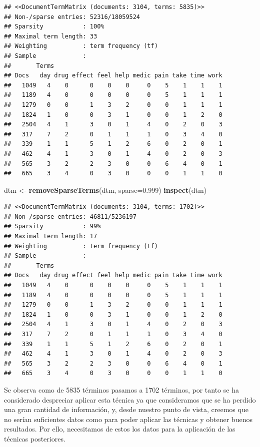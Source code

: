 \documentclass[spanish,]{article}
\newenvironment{Shaded}{\begin{snugshade}}{\end{snugshade}}
\newcommand{\KeywordTok}[1]{\textcolor[rgb]{0.13,0.29,0.53}{\textbf{#1}}}
\newcommand{\DataTypeTok}[1]{\textcolor[rgb]{0.13,0.29,0.53}{#1}}
\newcommand{\FloatTok}[1]{\textcolor[rgb]{0.00,0.00,0.81}{#1}}
\newcommand{\StringTok}[1]{\textcolor[rgb]{0.31,0.60,0.02}{#1}}
\newcommand{\NormalTok}[1]{#1}
\begin{document}
\begin{verbatim}
## <<DocumentTermMatrix (documents: 3104, terms: 5835)>>
## Non-/sparse entries: 52316/18059524
## Sparsity           : 100%
## Maximal term length: 33
## Weighting          : term frequency (tf)
## Sample             :
##       Terms
## Docs   day drug effect feel help medic pain take time work
##   1049   4    0      0    0    0     0    5    1    1    1
##   1189   4    0      0    0    0     0    5    1    1    1
##   1279   0    0      1    3    2     0    0    1    1    1
##   1824   1    0      0    3    1     0    0    1    2    0
##   2504   4    1      3    0    1     4    0    2    0    3
##   317    7    2      0    1    1     1    0    3    4    0
##   339    1    1      5    1    2     6    0    2    0    1
##   462    4    1      3    0    1     4    0    2    0    3
##   565    3    2      2    3    0     0    6    4    0    1
##   665    3    4      0    3    0     0    0    1    1    0
\end{verbatim}

\begin{Shaded}
\begin{Highlighting}[]
\NormalTok{dtm <-}\StringTok{ }\KeywordTok{removeSparseTerms}\NormalTok{(dtm, }\DataTypeTok{sparse=}\FloatTok{0.999}\NormalTok{)}
\KeywordTok{inspect}\NormalTok{(dtm)}
\end{Highlighting}
\end{Shaded}

\begin{verbatim}
## <<DocumentTermMatrix (documents: 3104, terms: 1702)>>
## Non-/sparse entries: 46811/5236197
## Sparsity           : 99%
## Maximal term length: 17
## Weighting          : term frequency (tf)
## Sample             :
##       Terms
## Docs   day drug effect feel help medic pain take time work
##   1049   4    0      0    0    0     0    5    1    1    1
##   1189   4    0      0    0    0     0    5    1    1    1
##   1279   0    0      1    3    2     0    0    1    1    1
##   1824   1    0      0    3    1     0    0    1    2    0
##   2504   4    1      3    0    1     4    0    2    0    3
##   317    7    2      0    1    1     1    0    3    4    0
##   339    1    1      5    1    2     6    0    2    0    1
##   462    4    1      3    0    1     4    0    2    0    3
##   565    3    2      2    3    0     0    6    4    0    1
##   665    3    4      0    3    0     0    0    1    1    0
\end{verbatim}

Se observa como de 5835 términos pasamos a 1702 términos, por tanto se
ha considerado despreciar aplicar esta técnica ya que consideramos que
se ha perdido una gran cantidad de información, y, desde nuestro punto
de vista, creemos que no serían suficientes datos como para poder
aplicar las técnicas y obtener buenos resultados. Por ello, necesitamos
de estos los datos para la aplicación de las técnicas posteriores.
\end{document}
